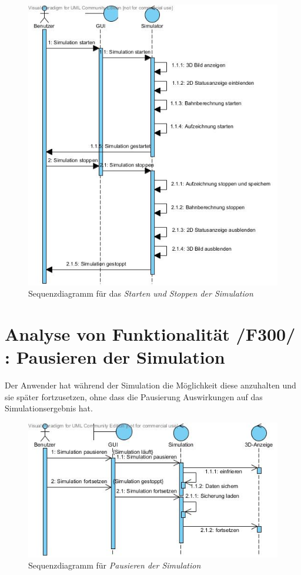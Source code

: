 \begin{figure}
\includegraphics[width=\linewidth]{bilder/Simulator_Starten_Stoppen}
\caption{Sequenzdiagramm für das \textit{Starten und Stoppen der Simulation}}
\end{figure}

\section{Analyse von Funktionalität /F300/ :  Pausieren der Simulation}
Der Anwender hat während der Simulation die Möglichkeit diese anzuhalten und sie später fortzusetzen, ohne dass die Pausierung Auswirkungen auf das Simulationsergebnis hat.

\begin{figure}
\includegraphics[width=\linewidth]{bilder/Pausieren.jpg}
\caption{Sequenzdiagramm für \textit{Pausieren der Simulation}}
\end{figure}

